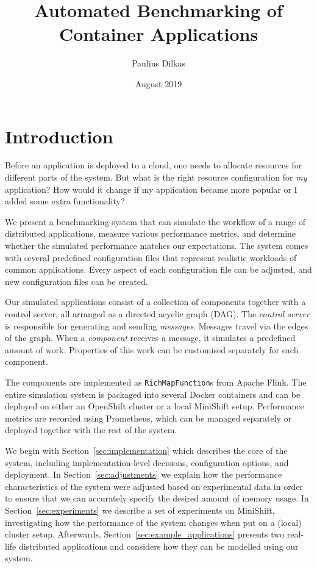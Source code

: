 \documentclass{article}
\title{Automated Benchmarking of Container Applications}
\author{Paulius Dilkas}
\date{August 2019}
\begin{document}
\maketitle

\section{Introduction}

Before an application is deployed to a cloud, one needs to allocate resources
for different parts of the system. But what is the right resource configuration
for \emph{my} application? How would it change if my application became more
popular or I added some extra functionality?

We present a benchmarking system that can simulate the workflow of a range of
distributed applications, measure various performance metrics, and determine
whether the simulated performance matches our expectations. The system comes
with several predefined configuration files that represent realistic workloads
of common applications. Every aspect of each configuration file can be adjusted,
and new configuration files can be created.

Our simulated applications consist of a collection of components together with a
control server, all arranged as a directed acyclic graph (DAG). The
\emph{control server} is responsible for generating and sending \emph{messages}.
Messages travel via the edges of the graph. When a \emph{component} receives a
message, it simulates a predefined amount of work. Properties of this work can
be customised separately for each component.

The components are implemented as \texttt{RichMapFunction}s from Apache Flink.
The entire simulation system is packaged into several Docker containers and can
be deployed on either an OpenShift cluster or a local MiniShift setup.
Performance metrics are recorded using Prometheus, which can be managed
separately or deployed together with the rest of the system.

We begin with Section~\ref{sec:implementation} which describes the core of the
system, including implementation-level decisions, configuration options, and
deployment. In Section~\ref{sec:adjustments} we explain how the performance
characteristics of the system were adjusted based on experimental data in order
to ensure that we can accurately specify the desired amount of memory usage. In
Section~\ref{sec:experiments} we describe a set of experiments on MiniShift,
investigating how the performance of the system changes when put on a (local)
cluster setup. Afterwards, Section~\ref{sec:example_applications} presents two
real-life distributed applications and considers how they can be modelled using
our system.
\end{document}
